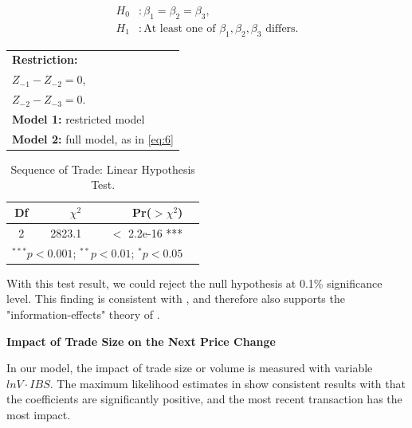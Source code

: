 \[
\begin{aligned}
H_0 &: \beta_1 = \beta_2 = \beta_3, \\
H_1 &: \text{At least one of } \beta_1, \beta_2, \beta_3 \text{ differs}.
\end{aligned}
\]
    \begin{tabular}{l}
        \textbf{Restriction:}\\
        $Z_{-1} - Z_{-2} = 0$,\\
        $Z_{-2} - Z_{-3} = 0$.\\
        \textbf{Model 1:} restricted model\\
        \textbf{Model 2:} full model, as in \eqref{eq:6}
    \end{tabular}
    
\begin{table}[htbp]
    \centering
    \vspace{0.5em}
    \begin{tabular}{crrl}
        \toprule
        Df & $\chi^2$ & Pr($>$$\chi^2$) \\
        \midrule
         2 & 2823.1 & $<$ 2.2e-16 *** \\ 
         \bottomrule
        \multicolumn{3}{l}{$^{***}p < 0.001$; $^{**}p < 0.01$; $^{*}p < 0.05$}
    \end{tabular}
        \caption{Sequence of Trade: Linear Hypothesis Test.}
    \label{tab:table-8}
\end{table}

With this test result, we could reject the null hypothesis at 0.1\% significance level. This finding is consistent with \citet{hausman1992}, and therefore also supports the "information-effects" theory of \citet{easleyohara1987}.



{\noindent\bfseries Impact of Trade Size on the Next Price Change}

In our model, the impact of trade size or volume is measured with variable \(lnV\cdot IBS \). The maximum likelihood estimates in  show consistent results with \citet{hausman1992} that the coefficients are significantly positive, and the most recent transaction has the most impact. 

